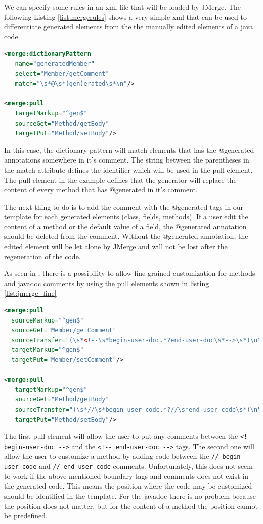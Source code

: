 We can specify some rules in an xml-file that will be loaded by JMerge.  The following Listing \ref{list:mergerules} shows a very simple xml that can be used to differentiate generated elements from the the manually edited elements of a java code. 

\begin{lstlisting}[language=xml, caption = Example JMerge Rule, label=list:mergerules]
<merge:dictionaryPattern
   name="generatedMember" 
   select="Member/getComment" 
   match="\s*@\s*(gen)erated\s*\n"/>

<merge:pull 
   targetMarkup="^gen$"
   sourceGet="Method/getBody"
   targetPut="Method/setBody"/>
\end{lstlisting}

In this case, the dictionary pattern will match elements that has the @generated annotations somewhere in it's comment. The string between the parentheses in the match attribute defines the identifier which will be used in the pull element. The pull element in the example defines that the generator will replace the content of every method that has @generated in it's comment.

The next thing to do is to add the comment with the @generated tags in our template for each generated elements (class, fields, methods). 
If a user edit the content of a method or the default value of a field, the @generated annotation should be deleted from the comment. Without the @generated annotation, the edited element will be let alone by JMerge and will not be lost after the regeneration of the code.  

As seen in \cite{APJMERGE}, there is a possibility to allow fine grained customization for methods and javadoc comments by using the pull elements shown in listing \ref{list:jmerge_fine}
\begin{lstlisting}[language=xml, caption=JMerge example: fine grained customization for javadoc comments and methods, label = ref{list:jmerge_fine}]
<merge:pull 
  sourceMarkup="^gen$"
  sourceGet="Member/getComment"
  sourceTransfer="(\s*<!--\s*begin-user-doc.*?end-user-doc\s*-->\s*)\n"
  targetMarkup="^gen$"
  targetPut="Member/setComment"/>
  
<merge:pull 
   targetMarkup="^gen$"
   sourceGet="Method/getBody"
   sourceTransfer="(\s*//\s*begin-user-code.*?//\s*end-user-code\s*)\n"
   targetPut="Method/setBody"/>

\end{lstlisting}

The first pull element will allow the user to put any comments between the \verb|<!-- begin-user-doc -->| and the \verb|<!-- end-user-doc -->| tags. %
The second one will allow the user to customize a method by adding code between the  \verb|// begin-user-code| and \verb|// end-user-code| comments. Unfortunately, this does not seem to work if the above mentioned boundary tags and comments does not exist in the generated code. This means the position where the code may be customized should be identified in the template. For the javadoc there is no problem because the position does not matter, but for the content of a method the position cannot be predefined. 

